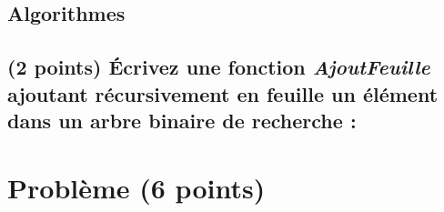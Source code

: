 \documentclass[11pt,a4paper]{article}
\begin{document}
\subsection*{Algorithmes}

%
%

\subsection{(2 points) \'Ecrivez une fonction \textit{AjoutFeuille} ajoutant récursivement en feuille un élément dans un arbre binaire de recherche : }

\begin{center}
\end{center}

\clearpage



\clearpage


\section{Problème (6 points)}


\end{document}
